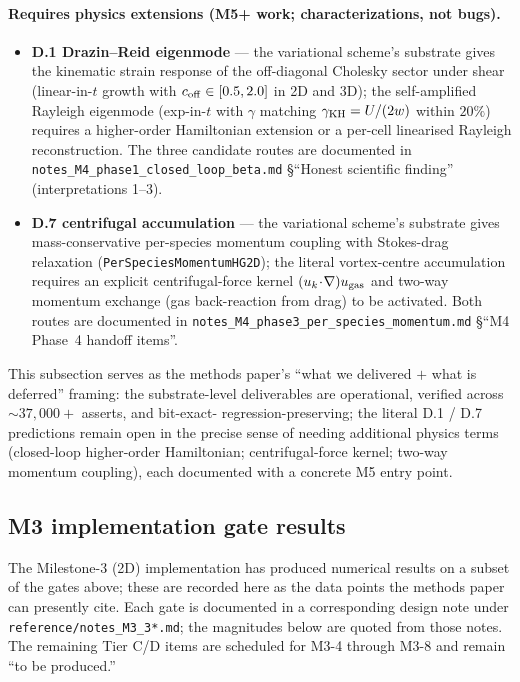 \documentclass[11pt]{article}
\begin{document}
\paragraph{Requires physics extensions (M5+ work; characterizations,
not bugs).}
\begin{itemize}
\item \textbf{D.1 Drazin--Reid eigenmode} --- the variational scheme's
substrate gives the kinematic strain response of the off-diagonal
Cholesky sector under shear (linear-in-$t$ growth with
$c_{\rm off} \in [0.5, 2.0]$ in 2D and 3D); the self-amplified
Rayleigh eigenmode (exp-in-$t$ with $\gamma$ matching $\gamma_{\rm
KH} = U/(2w)$ within $20\%$) requires a higher-order Hamiltonian
extension or a per-cell linearised Rayleigh reconstruction. The three
candidate routes are documented in \verb|notes_M4_phase1_closed_loop_beta.md|
\S``Honest scientific finding'' (interpretations 1--3).
\item \textbf{D.7 centrifugal accumulation} --- the variational
scheme's substrate gives mass-conservative per-species momentum
coupling with Stokes-drag relaxation
(\texttt{PerSpeciesMomentumHG2D}); the literal vortex-centre
accumulation requires an explicit centrifugal-force kernel
$(u_k\!\cdot\!\nabla)u_{\rm gas}$ and two-way momentum exchange (gas
back-reaction from drag) to be activated. Both routes are documented
in \verb|notes_M4_phase3_per_species_momentum.md| \S``M4 Phase~4
handoff items''.
\end{itemize}

This subsection serves as the methods paper's ``what we delivered $+$
what is deferred'' framing: the substrate-level deliverables are
operational, verified across $\sim 37{,}000+$ asserts, and bit-exact-
regression-preserving; the literal D.1 / D.7 predictions remain open
in the precise sense of needing additional physics terms (closed-loop
higher-order Hamiltonian; centrifugal-force kernel; two-way momentum
coupling), each documented with a concrete M5 entry point.

\subsection{M3 implementation gate results}
\label{sec:tier-M3-gates}

The Milestone-3 (2D) implementation has produced numerical results
on a subset of the gates above; these are recorded here as the
data points the methods paper can presently cite. Each gate is
documented in a corresponding design note under
\verb|reference/notes_M3_3*.md|; the magnitudes below are quoted
from those notes. The remaining Tier C/D items are scheduled for
M3-4 through M3-8 and remain ``to be produced.''
\end{document}
